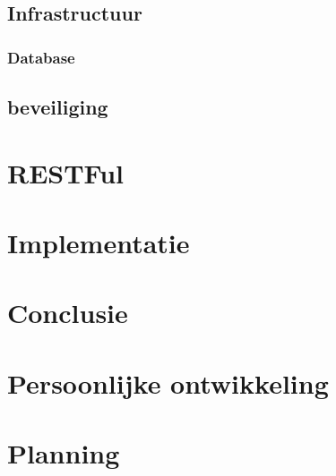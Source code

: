 \documentclass[a4paper,11pt,oneside]{report}
\begin{document}
\section{Infrastructuur}
\subsection{Database}
\section{beveiliging}
\chapter{RESTFul}



\chapter{Implementatie}











\chapter{Conclusie}




\appendix
\chapter{Persoonlijke ontwikkeling}
\lipsum[1]

\chapter{Planning}
  \label{chap:planning}


\newpage

\printglossary


\renewcommand{\bibname}{Bronvermeldingen}



\nocite{*}

\end{document}
